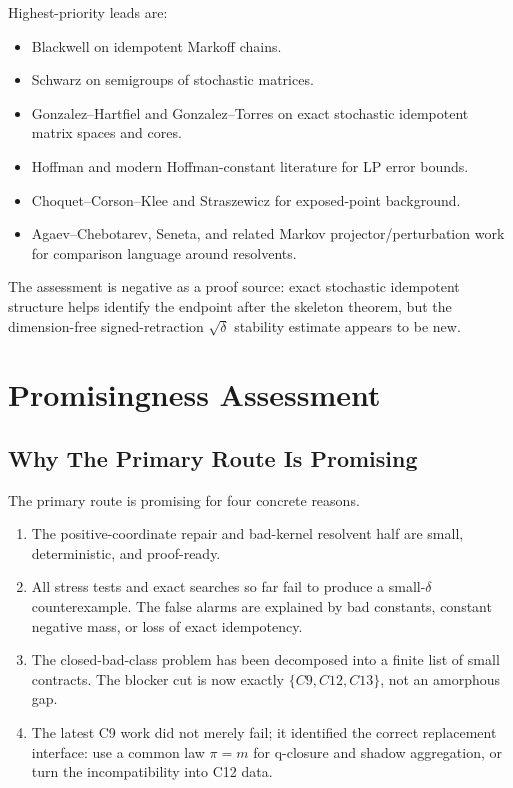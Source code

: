 \documentclass[11pt]{article}
\theoremstyle{definition}
\begin{document}
Highest-priority leads are:
\begin{itemize}[leftmargin=*]
\item Blackwell on idempotent Markoff chains.
\item Schwarz on semigroups of stochastic matrices.
\item Gonzalez--Hartfiel and Gonzalez--Torres on exact stochastic idempotent
matrix spaces and cores.
\item Hoffman and modern Hoffman-constant literature for LP error bounds.
\item Choquet--Corson--Klee and Straszewicz for exposed-point background.
\item Agaev--Chebotarev, Seneta, and related Markov projector/perturbation
work for comparison language around resolvents.
\end{itemize}

The assessment is negative as a proof source: exact stochastic idempotent
structure helps identify the endpoint after the skeleton theorem, but the
dimension-free signed-retraction \(\sqrt{\delta}\) stability estimate appears
to be new.

\section{Promisingness Assessment}

\subsection{Why The Primary Route Is Promising}

The primary route is promising for four concrete reasons.
\begin{enumerate}[label=\arabic*.]
\item The positive-coordinate repair and bad-kernel resolvent half are
small, deterministic, and proof-ready.
\item All stress tests and exact searches so far fail to produce a
small-\(\delta\) counterexample.  The false alarms are explained by bad
constants, constant negative mass, or loss of exact idempotency.
\item The closed-bad-class problem has been decomposed into a finite list of
small contracts.  The blocker cut is now exactly \(\{C9,C12,C13\}\), not an
amorphous gap.
\item The latest C9 work did not merely fail; it identified the correct
replacement interface: use a common law \(\pi=m\) for q-closure and shadow
aggregation, or turn the incompatibility into C12 data.
\end{enumerate}
\end{document}
